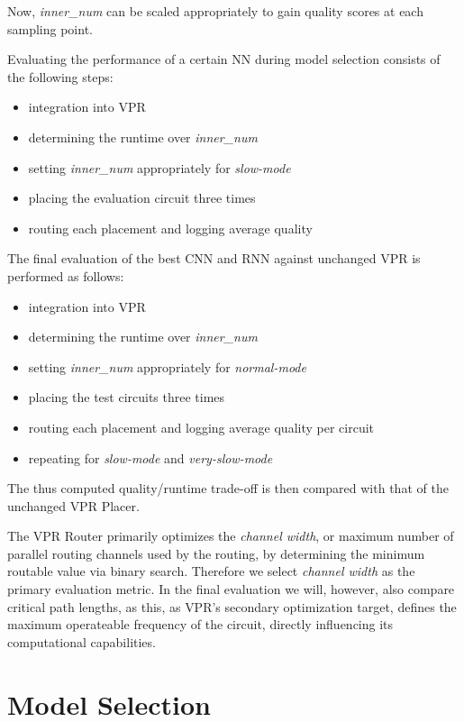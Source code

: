 Now, \textit{inner\_num} can be scaled appropriately to gain quality scores at each sampling point.

Evaluating the performance of a certain \gls{NN} during model selection consists of the following steps:

\begin{itemize}
	\item integration into \gls{VPR}
	\item determining the runtime over \textit{inner\_num}
	\item setting \textit{inner\_num} appropriately for \textit{slow-mode}
	\item placing the evaluation circuit three times
	\item routing each placement and logging average quality 
\end{itemize}

The final evaluation of the best \gls{CNN} and \gls{RNN} against unchanged \gls{VPR} is performed as follows:

\begin{itemize}
	\item integration into \gls{VPR}
	\item determining the runtime over \textit{inner\_num}
	\item setting \textit{inner\_num} appropriately for \textit{normal-mode}
	\item placing the test circuits three times
	\item routing each placement and logging average quality per circuit
	\item repeating for \textit{slow-mode} and \textit{very-slow-mode}
\end{itemize}

The thus computed quality/runtime trade-off is then compared with that of the unchanged \gls{VPR} Placer.

The \gls{VPR} Router primarily optimizes the \textit{channel width}, or maximum number of parallel routing channels used by the routing, by determining the minimum routable value via binary search. Therefore we select \textit{channel width} as the primary evaluation metric. In the final evaluation we will, however, also compare critical path lengths, as this, as \gls{VPR}'s secondary optimization target, defines the maximum operateable frequency of the circuit, directly influencing its computational capabilities.

\section{Model Selection}\label{ch:model-selection}

